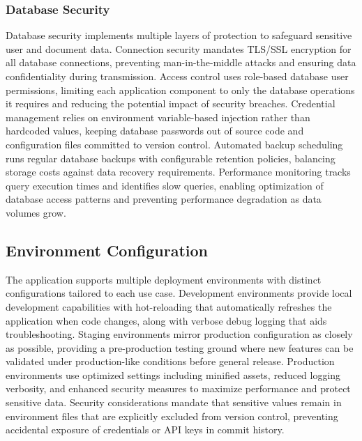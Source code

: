 \subsubsection{Database Security}
Database security implements multiple layers of protection to safeguard sensitive user and document data. Connection security mandates TLS/SSL encryption for all database connections, preventing man-in-the-middle attacks and ensuring data confidentiality during transmission. Access control uses role-based database user permissions, limiting each application component to only the database operations it requires and reducing the potential impact of security breaches. Credential management relies on environment variable-based injection rather than hardcoded values, keeping database passwords out of source code and configuration files committed to version control. Automated backup scheduling runs regular database backups with configurable retention policies, balancing storage costs against data recovery requirements. Performance monitoring tracks query execution times and identifies slow queries, enabling optimization of database access patterns and preventing performance degradation as data volumes grow.

\subsection{Environment Configuration}
The application supports multiple deployment environments with distinct configurations tailored to each use case. Development environments provide local development capabilities with hot-reloading that automatically refreshes the application when code changes, along with verbose debug logging that aids troubleshooting. Staging environments mirror production configuration as closely as possible, providing a pre-production testing ground where new features can be validated under production-like conditions before general release. Production environments use optimized settings including minified assets, reduced logging verbosity, and enhanced security measures to maximize performance and protect sensitive data. Security considerations mandate that sensitive values remain in environment files that are explicitly excluded from version control, preventing accidental exposure of credentials or API keys in commit history.

